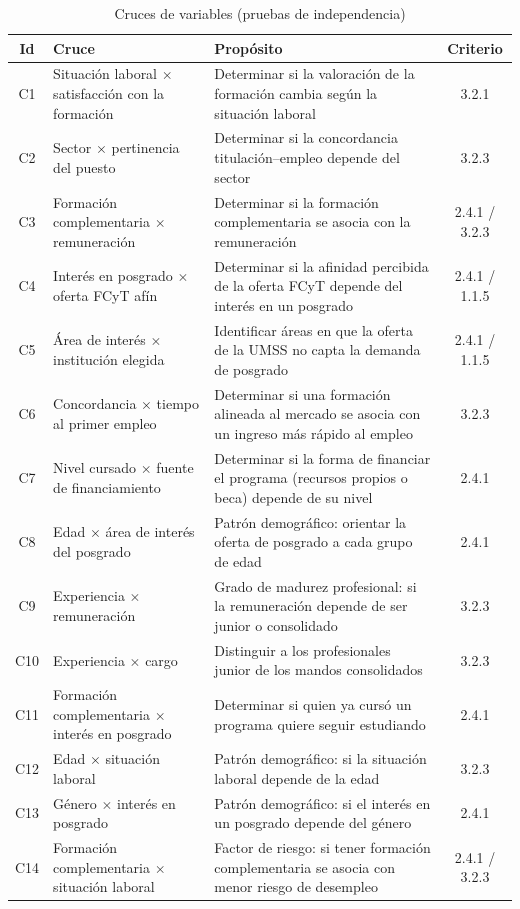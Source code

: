 \documentclass[12pt, a4paper]{article}
\newenvironment{mitabla}[2][H]{%
  \begin{table}[#1]
  \centering
  \caption{#2}
  \small
}{%
  \end{table}
}
\begin{document}
\begin{mitabla}{Cruces de variables (pruebas de independencia)\label{tab:cruces}}
\begin{tabular}{cL{5.4cm}L{5.8cm}c}
\toprule
Id & Cruce & Propósito & Criterio \\
\midrule
C1 & Situación laboral $\times$ satisfacción con la formación & Determinar si la valoración de la formación cambia según la situación laboral & 3.2.1 \\
C2 & Sector $\times$ pertinencia del puesto & Determinar si la concordancia titulación--empleo depende del sector & 3.2.3 \\
C3 & Formación complementaria $\times$ remuneración & Determinar si la formación complementaria se asocia con la remuneración & 2.4.1 / 3.2.3 \\
C4 & Interés en posgrado $\times$ oferta FCyT afín & Determinar si la afinidad percibida de la oferta FCyT depende del interés en un posgrado & 2.4.1 / 1.1.5 \\
C5 & Área de interés $\times$ institución elegida & Identificar áreas en que la oferta de la UMSS no capta la demanda de posgrado & 2.4.1 / 1.1.5 \\
C6 & Concordancia $\times$ tiempo al primer empleo & Determinar si una formación alineada al mercado se asocia con un ingreso más rápido al empleo & 3.2.3 \\
C7 & Nivel cursado $\times$ fuente de financiamiento & Determinar si la forma de financiar el programa (recursos propios o beca) depende de su nivel & 2.4.1 \\
C8 & Edad $\times$ área de interés del posgrado & Patrón demográfico: orientar la oferta de posgrado a cada grupo de edad & 2.4.1 \\
C9 & Experiencia $\times$ remuneración & Grado de madurez profesional: si la remuneración depende de ser junior o consolidado & 3.2.3 \\
C10 & Experiencia $\times$ cargo & Distinguir a los profesionales junior de los mandos consolidados & 3.2.3 \\
C11 & Formación complementaria $\times$ interés en posgrado & Determinar si quien ya cursó un programa quiere seguir estudiando & 2.4.1 \\
C12 & Edad $\times$ situación laboral & Patrón demográfico: si la situación laboral depende de la edad & 3.2.3 \\
C13 & Género $\times$ interés en posgrado & Patrón demográfico: si el interés en un posgrado depende del género & 2.4.1 \\
C14 & Formación complementaria $\times$ situación laboral & Factor de riesgo: si tener formación complementaria se asocia con menor riesgo de desempleo & 2.4.1 / 3.2.3 \\
\bottomrule
\end{tabular}
\end{mitabla}
\end{document}

